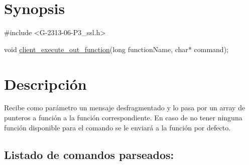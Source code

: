 \hypertarget{client_execute_out_function_synopsis_6}{}\section{Synopsis}\label{client_execute_out_function_synopsis_6}

\begin{DoxyCode}
\textcolor{preprocessor}{#include <G-2313-06-P3\_ssl.h>}

\textcolor{keywordtype}{void} \hyperlink{G-2313-06-P2__client_8h_a26512d35b24fec46c8fa4c803dc00867}{client\_execute\_out\_function}(\textcolor{keywordtype}{long} functionName, \textcolor{keywordtype}{char}* command);
\end{DoxyCode}
 \hypertarget{client_execute_out_function_descripcion_6}{}\section{Descripción}\label{client_execute_out_function_descripcion_6}
Recibe como parámetro un mensaje desfragmentado y lo pasa por un array de punteros a función a la función correspondiente. En caso de no tener ninguna función disponible para el comando se le enviará a la función por defecto. ~\newline
\subsection*{Listado de comandos parseados\+:}


